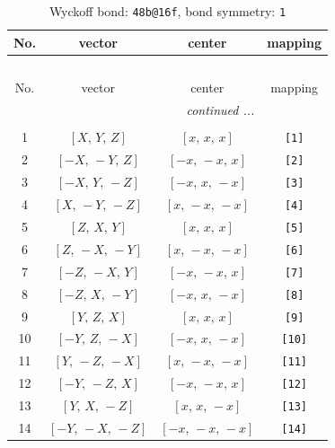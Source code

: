 \documentclass[fleqn,8pt]{jsarticle}
\begin{document}
\begin{longtable}{cccc}
\caption{Wyckoff bond: {\tt 48b@16f}, bond symmetry: {\tt 1}}
 \\
 \hline \hline
No. & vector & center & mapping \\ \hline \endfirsthead

\multicolumn{3}{l}{\tablename\ \thetable{}} \\
 \hline \hline
No. & vector & center & mapping \\ \hline \endhead

 \hline \hline
\multicolumn{3}{r}{\footnotesize\it continued ...} \\ \endfoot

 \hline \hline
\multicolumn{3}{r}{} \\ \endlastfoot

1 & $\left[ X,\, Y,\, Z \right]$ & $\left[ x,\, x,\, x \right]$ & {\tt [1]} \\ \hline
2 & $\left[ - X,\, - Y,\, Z \right]$ & $\left[ - x,\, - x,\, x \right]$ & {\tt [2]} \\ \hline
3 & $\left[ - X,\, Y,\, - Z \right]$ & $\left[ - x,\, x,\, - x \right]$ & {\tt [3]} \\ \hline
4 & $\left[ X,\, - Y,\, - Z \right]$ & $\left[ x,\, - x,\, - x \right]$ & {\tt [4]} \\ \hline
5 & $\left[ Z,\, X,\, Y \right]$ & $\left[ x,\, x,\, x \right]$ & {\tt [5]} \\ \hline
6 & $\left[ Z,\, - X,\, - Y \right]$ & $\left[ x,\, - x,\, - x \right]$ & {\tt [6]} \\ \hline
7 & $\left[ - Z,\, - X,\, Y \right]$ & $\left[ - x,\, - x,\, x \right]$ & {\tt [7]} \\ \hline
8 & $\left[ - Z,\, X,\, - Y \right]$ & $\left[ - x,\, x,\, - x \right]$ & {\tt [8]} \\ \hline
9 & $\left[ Y,\, Z,\, X \right]$ & $\left[ x,\, x,\, x \right]$ & {\tt [9]} \\ \hline
10 & $\left[ - Y,\, Z,\, - X \right]$ & $\left[ - x,\, x,\, - x \right]$ & {\tt [10]} \\ \hline
11 & $\left[ Y,\, - Z,\, - X \right]$ & $\left[ x,\, - x,\, - x \right]$ & {\tt [11]} \\ \hline
12 & $\left[ - Y,\, - Z,\, X \right]$ & $\left[ - x,\, - x,\, x \right]$ & {\tt [12]} \\ \hline
13 & $\left[ Y,\, X,\, - Z \right]$ & $\left[ x,\, x,\, - x \right]$ & {\tt [13]} \\ \hline
14 & $\left[ - Y,\, - X,\, - Z \right]$ & $\left[ - x,\, - x,\, - x \right]$ & {\tt [14]} \\ \hline

\end{longtable}
\end{document}
